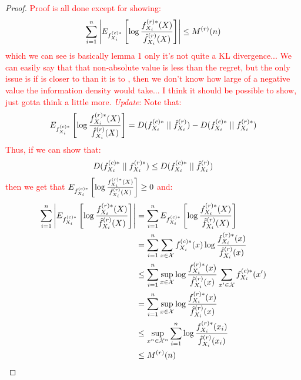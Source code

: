 \begin{proof}
\textcolor{red}
{Proof is all done except for showing:
\begin{equation}
\sum_{i=1}^n \left| E_{f_{X_i}^{(c)*}} \left[
\log \frac{f_{X_i}^{(r)*}(X)}{\hat{f}_{X_i}^{(r)}(X)} \right] \right| \le M^{(r)}(n)
\end{equation}
\noindent which we can see is basically lemma 1 only it's not quite a KL divergence... We can easily say that that non-absolute value is less than the regret, but the only issue is if  is closer to  than it is to , then we don't know how large of a negative value the information density would take... I think it should be possible to show, just gotta think a little more.
\emph{Update}:
Note that:
\begin{equation}
E_{f_{X_i}^{(c)*}} \left[
\log \frac{f_{X_i}^{(r)*}(X)}{\hat{f}_{X_i}^{(r)}(X)} \right] =
D(f_{X_i}^{(c)*} \mid \mid \hat{f}_{X_i}^{(r)}) - D(f_{X_i}^{(c)*} \mid \mid f_{X_i}^{(r)*})
\end{equation}
Thus, if we can show that:
$$D(f_{X_i}^{(c)*} \mid \mid f_{X_i}^{(r)*}) \le D(f_{X_i}^{(c)*} \mid \mid \hat{f}_{X_i}^{(r)})$$
then we get that $E_{f_{X_i}^{(c)*}} \left[\log \frac{f_{X_i}^{(r)*}(X)}{\hat{f}_{X_i}^{(r)}(X)} \right] \ge 0$ and:
\begin{equation}
\begin{aligned}
\sum_{i=1}^n \left| E_{f_{X_i}^{(c)*}} \left[
\log \frac{f_{X_i}^{(r)*}(X)}{\hat{f}_{X_i}^{(r)}(X)} \right] \right|
&= \sum_{i=1}^n E_{f_{X_i}^{(c)*}} \left[
\log \frac{f_{X_i}^{(r)*}(X)}{\hat{f}_{X_i}^{(r)}(X)} \right] \\
&= \sum_{i=1}^n  \sum_{x\in\mathcal{X}} f_{X_i}^{(c)*}(x)
\log \frac{f_{X_i}^{(r)*}(x)}{\hat{f}_{X_i}^{(r)}(x)} \\
&\le  \sum_{i=1}^n \sup_{x\in\mathcal{X}} \log \frac{f_{X_i}^{(r)*}(x)}{\hat{f}_{X_i}^{(r)}(x)} \sum_{x'\in\mathcal{X}} f_{X_i}^{(c)*}(x') \\
&= \sum_{i=1}^n \sup_{x\in\mathcal{X}} \log \frac{f_{X_i}^{(r)*}(x)}{\hat{f}_{X_i}^{(r)}(x)} \\
&\le \sup_{x^n\in\mathcal{X}^n} \sum_{i=1}^n \log \frac{f_{X_i}^{(r)*}(x_i)}{\hat{f}_{X_i}^{(r)}(x_i)} \\
&\le M^{(r)}(n)
\end{aligned}
\end{equation}
}
\end{proof}